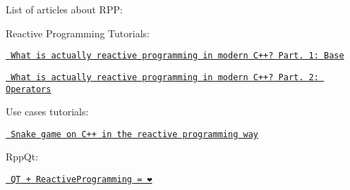List of articles about RPP\+:

Reactive Programming Tutorials\+:
\begin{DoxyItemize}
\item \href{https://medium.com/@victimsnino/what-is-actually-reactive-programming-in-modern-c-part-1-base-929355ac2901?source=friends_link&sk=59986e68b0688469c65ca0c757bbfd89}{\texttt{ What is actually reactive programming in modern C++? Part. 1\+: Base}}
\item \href{https://itnext.io/what-is-actually-reactive-programming-in-modern-c-part-2-operators-63d5ea7223cc?source=friends_link&sk=73cc7b8928d2944569e07f402d43d123}{\texttt{ What is actually reactive programming in modern C++? Part. 2\+: Operators}}
\end{DoxyItemize}

Use cases tutorials\+:
\begin{DoxyItemize}
\item \href{https://medium.com/@victimsnino/snake-game-on-c-in-the-reactive-programming-way-19310a73923a?source=friends_link&sk=608039f66da373d4f81c806ffe58298c}{\texttt{ Snake game on C++ in the reactive programming way}}
\end{DoxyItemize}

Rpp\+Qt\+:
\begin{DoxyItemize}
\item \href{https://itnext.io/qt-reactiveprogramming-1ba0106c17d8?source=friends_link&sk=59c3cb817d56996094b640aeba629bd0}{\texttt{ QT + Reactive\+Programming = ❤}} 
\end{DoxyItemize}
